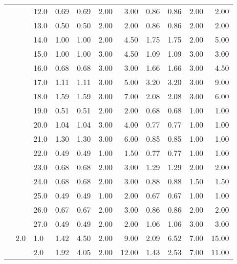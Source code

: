 \begin{tabular}{lllrrrrrrrr}
          &     & 12.0 &       0.69 &      0.69 &  2.00 &   3.00 &       0.86 &      0.86 &  2.00 &   2.00 \\
          &     & 13.0 &       0.50 &      0.50 &  2.00 &   2.00 &       0.86 &      0.86 &  2.00 &   2.00 \\
          &     & 14.0 &       1.00 &      1.00 &  2.00 &   4.50 &       1.75 &      1.75 &  2.00 &   5.00 \\
          &     & 15.0 &       1.00 &      1.00 &  3.00 &   4.50 &       1.09 &      1.09 &  3.00 &   3.00 \\
          &     & 16.0 &       0.68 &      0.68 &  3.00 &   3.00 &       1.66 &      1.66 &  3.00 &   4.50 \\
          &     & 17.0 &       1.11 &      1.11 &  3.00 &   5.00 &       3.20 &      3.20 &  3.00 &   9.00 \\
          &     & 18.0 &       1.59 &      1.59 &  3.00 &   7.00 &       2.08 &      2.08 &  3.00 &   6.00 \\
          &     & 19.0 &       0.51 &      0.51 &  2.00 &   2.00 &       0.68 &      0.68 &  1.00 &   1.00 \\
          &     & 20.0 &       1.04 &      1.04 &  3.00 &   4.00 &       0.77 &      0.77 &  1.00 &   1.00 \\
          &     & 21.0 &       1.30 &      1.30 &  3.00 &   6.00 &       0.85 &      0.85 &  1.00 &   1.00 \\
          &     & 22.0 &       0.49 &      0.49 &  1.00 &   1.50 &       0.77 &      0.77 &  1.00 &   1.00 \\
          &     & 23.0 &       0.68 &      0.68 &  2.00 &   3.00 &       1.29 &      1.29 &  2.00 &   2.00 \\
          &     & 24.0 &       0.68 &      0.68 &  2.00 &   3.00 &       0.88 &      0.88 &  1.50 &   1.50 \\
          &     & 25.0 &       0.49 &      0.49 &  1.00 &   2.00 &       0.67 &      0.67 &  1.00 &   1.00 \\
          &     & 26.0 &       0.67 &      0.67 &  2.00 &   3.00 &       0.86 &      0.86 &  2.00 &   2.00 \\
          &     & 27.0 &       0.49 &      0.49 &  2.00 &   2.00 &       1.06 &      1.06 &  3.00 &   3.00 \\
          & 2.0 & 1.0  &       1.42 &      4.50 &  2.00 &   9.00 &       2.09 &      6.52 &  7.00 &  15.00 \\
          &     & 2.0  &       1.92 &      4.05 &  2.00 &  12.00 &       1.43 &      2.53 &  7.00 &  11.00 \\

\end{tabular}
